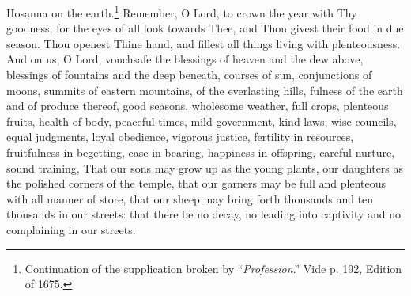 
Hosanna on the earth.\footnote{Continuation of the supplication broken by “\emph{Profession}.” Vide p. 192, Edition of 1675.} Remember, O Lord, to crown the year with Thy goodness; for the eyes of all look towards Thee, and Thou givest their food in due season. Thou openest Thine hand, and fillest all things living with plenteousness. And on us, O Lord, vouchsafe the blessings of heaven and the dew above, blessings of fountains and the deep beneath, courses of sun, conjunctions of moons, summits of eastern mountains, of the everlasting hills, fulness of the earth and of produce thereof, good seasons, wholesome weather, full crops, plenteous fruits, health of body, peaceful times, mild government, kind laws, wise councils, equal judgments, loyal obedience, vigorous justice, fertility in resources, fruitfulness in begetting, ease in bearing, happiness in offspring, careful nurture, sound training, That our sons may grow up as the young plants, our daughters as the polished corners of the temple, that our garners may be full and plenteous with all manner of store,  that our sheep may bring forth thousands and ten thousands in our streets: that there be no decay, no leading into captivity and no complaining in our streets.


